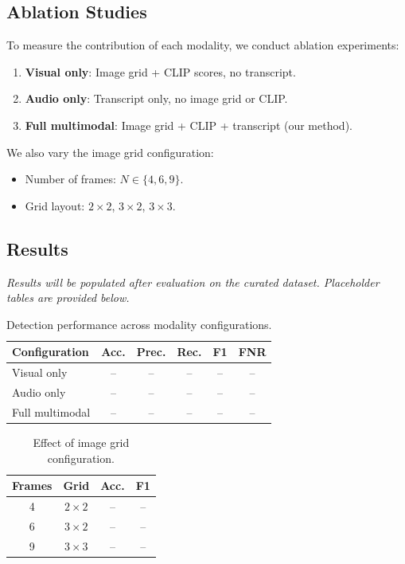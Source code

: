 \documentclass[12pt,a4paper]{article}
\begin{document}
\subsection{Ablation Studies}

To measure the contribution of each modality, we conduct ablation
experiments:
\begin{enumerate}[nosep]
  \item \textbf{Visual only}: Image grid + CLIP scores, no transcript.
  \item \textbf{Audio only}: Transcript only, no image grid or CLIP.
  \item \textbf{Full multimodal}: Image grid + CLIP + transcript (our method).
\end{enumerate}

We also vary the image grid configuration:
\begin{itemize}[nosep]
  \item Number of frames: $N \in \{4, 6, 9\}$.
  \item Grid layout: $2 \times 2$, $3 \times 2$, $3 \times 3$.
\end{itemize}

\subsection{Results}

\emph{Results will be populated after evaluation on the curated dataset.
Placeholder tables are provided below.}

\begin{table}[h]
\centering
\caption{Detection performance across modality configurations.}
\label{tab:results}
\begin{tabular}{lccccc}
\toprule
\textbf{Configuration} & \textbf{Acc.} & \textbf{Prec.} & \textbf{Rec.} & \textbf{F1} & \textbf{FNR} \\
\midrule
Visual only        & --  & --  & --  & --  & -- \\
Audio only         & --  & --  & --  & --  & -- \\
Full multimodal    & --  & --  & --  & --  & -- \\
\bottomrule
\end{tabular}
\end{table}

\begin{table}[h]
\centering
\caption{Effect of image grid configuration.}
\label{tab:ablation_grid}
\begin{tabular}{cccc}
\toprule
\textbf{Frames} & \textbf{Grid} & \textbf{Acc.} & \textbf{F1} \\
\midrule
4  & $2 \times 2$ & -- & -- \\
6  & $3 \times 2$ & -- & -- \\
9  & $3 \times 3$ & -- & -- \\
\bottomrule
\end{tabular}
\end{table}
\end{document}
